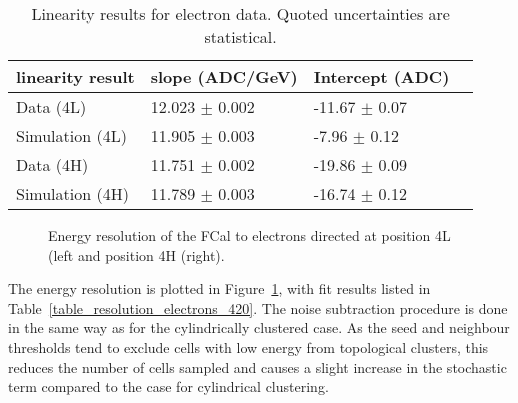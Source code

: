 \begin{table}[!htb]
\begin{center}
\begin{tabular}{|l|l|l|l|}
\hline
linearity result & slope (ADC/GeV)& Intercept (ADC) \\
\hline
Data (4L) & 12.023 $\pm$ 0.002 & -11.67 $\pm$ 0.07 \\
Simulation (4L) & 11.905 $\pm$ 0.003 & -7.96 $\pm$ 0.12 \\
Data (4H) & 11.751 $\pm$ 0.002 & -19.86 $\pm$ 0.09 \\
Simulation (4H) & 11.789 $\pm$ 0.003 & -16.74 $\pm$ 0.12 \\
\hline
\end{tabular}
\caption{Linearity results for electron data. Quoted uncertainties are statistical.}
\label{table_electron_420_linearity}
\end{center}
\end{table}
\begin{figure}[!htb]
\begin{centering}
\caption{Energy resolution of the FCal to electrons directed at position 4L (left and position 4H (right).} 
\label{electron_resolution_t420}
\end{centering}
\end{figure}

The energy resolution is plotted in Figure~\ref{electron_resolution_t420}, with fit results listed in Table~\ref{table_resolution_electrons_420}. The noise subtraction procedure is done in the same way as for the cylindrically clustered case. As the seed and neighbour thresholds tend to exclude cells with low energy from topological clusters, this reduces the number of cells sampled and causes a slight increase in the stochastic term compared to the case for cylindrical clustering. 






